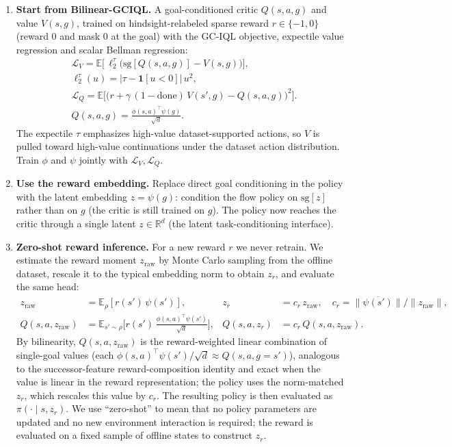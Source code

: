 \documentclass[11pt]{article}
\newcommand{\E}{\mathbb{E}}
\newcommand{\sg}{\mathrm{sg}}
\newcommand{\R}{\mathbb{R}}
\begin{document}
\begin{enumerate}
    \item \textbf{Start from Bilinear-GCIQL.}
    A goal-conditioned critic $Q(s,a,g)$ and value $V(s,g)$, trained on hindsight-relabeled sparse reward $r\in\{-1,0\}$ (reward $0$ and mask $0$ at the goal) with the GC-IQL objective, expectile value regression and scalar Bellman regression:
    \begin{align}
        & \mathcal L_V = \E\big[\,\ell^\tau_2\big(\sg[Q(s,a,g)]-V(s,g)\big)\big], \\
        & \ell^\tau_2(u)=\big|\tau-\mathbf 1[u<0]\big|\,u^2, \\
        & \mathcal L_Q = \E\big[\big(r+\gamma\,(1{-}\mathrm{done})\,V(s',g)-Q(s,a,g)\big)^2\big]. \\
        & Q(s,a,g)=\frac{\phi(s,a)^\top\psi(g)}{\sqrt d}.
    \end{align}
    The expectile $\tau$ emphasizes high-value dataset-supported actions, so $V$ is pulled toward high-value continuations under the dataset action distribution.
    Train $\phi$ and $\psi$ jointly with $\mathcal L_V,\mathcal L_Q$.

    \item \textbf{Use the reward embedding.}
    Replace direct goal conditioning in the policy with the latent embedding $z=\psi(g)$: condition the flow policy on $\sg[z]$ rather than on $g$ (the critic is still trained on $g$).
    The policy now reaches the critic through a single latent $z\in\R^d$ (the latent task-conditioning interface).

    \item \textbf{Zero-shot reward inference.}
    For a new reward $r$ we never retrain.
    We estimate the reward moment $z_{\mathrm{raw}}$ by Monte Carlo sampling from the offline dataset, rescale it to the typical embedding norm to obtain $z_r$, and evaluate the same head:
    \begin{align}
        z_{\mathrm{raw}} &= \E_\rho[r(s')\,\psi(s')], &
        z_r &= c_r\,z_{\mathrm{raw}},\quad c_r = \overline{\|\psi(s')\|}\big/\|z_{\mathrm{raw}}\|, \\
        Q(s,a,z_{\mathrm{raw}}) &= \E_{s'\sim\rho}\!\Big[r(s')\,\tfrac{\phi(s,a)^\top\psi(s')}{\sqrt d}\Big], &
        Q(s,a,z_r) &= c_r\,Q(s,a,z_{\mathrm{raw}}).
    \end{align}
    By bilinearity, $Q(s,a,z_{\mathrm{raw}})$ is the reward-weighted linear combination of single-goal values (each $\phi(s,a)^\top\psi(s')/\sqrt d\approx Q(s,a,g{=}s')$), analogous to the successor-feature reward-composition identity and exact when the value is linear in the reward representation; the policy uses the norm-matched $z_r$, which rescales this value by $c_r$.
    The resulting policy is then evaluated as $\pi(\cdot\mid s,z_r)$.
    We use ``zero-shot'' to mean that no policy parameters are updated and no new environment interaction is required; the reward is evaluated on a fixed sample of offline states to construct $z_r$.
\end{enumerate}
\end{document}
